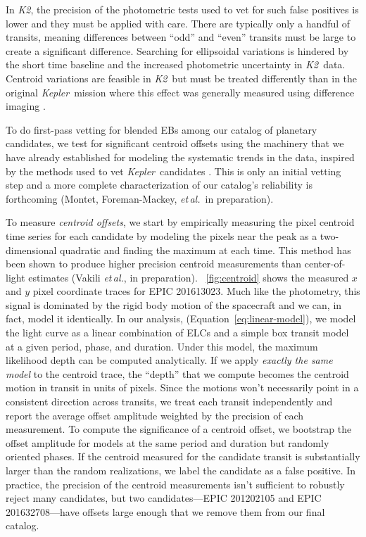 \documentclass[12pt,preprint]{aastex}
\newcommand{\project}[1]{\textsl{#1}} %
\newcommand{\kepler}{\project{Kepler}}
\newcommand{\KT}{\project{K2}}
\newcommand{\foreign}[1]{\emph{#1}}
\newcommand{\etal}{\foreign{et\,al.}}
\newcommand{\figref}[1]{\ref{fig:#1}}
\newcommand{\Fig}[1]{\figurename~\figref{#1}}
\newcommand{\eqalt}[1]{Equation~\ref{eq:#1}}
\begin{document}
In \KT, the precision of the photometric tests used to vet for such
false positives  is lower and they must be applied
with care.  There are typically only a handful of transits, meaning
differences between ``odd'' and ``even'' transits must be large to
create a significant difference. Searching for ellipsoidal variations
is hindered by the short time baseline and the increased photometric
uncertainty in \KT\ data.  Centroid variations are feasible in
\KT\ but must be treated differently than in the original
\kepler\ mission where this effect was generally measured using
difference imaging \citep{Batalha:2010, Bryson:2013}.

To do first-pass vetting for blended EBs among our catalog of
planetary candidates, we test for significant centroid offsets using
the machinery that we have already established for modeling the
systematic trends in the data, inspired by the methods used to vet
\kepler\ candidates \citep{Bryson:2013}.  This is only an initial vetting step
and a more complete characterization of our catalog's reliability is
forthcoming (Montet, Foreman-Mackey, \etal\ in preparation).

To measure \emph{centroid offsets}, we start by empirically measuring the
pixel centroid time series for each candidate by modeling the pixels near the
peak as a two-dimensional quadratic and finding the maximum at each time.
This method has been shown to produce higher precision centroid measurements
than center-of-light estimates (Vakili \etal, in preparation).
\Fig{centroid} shows the measured $x$ and $y$ pixel coordinate traces for EPIC
201613023.
Much like the photometry, this signal is dominated by the rigid body motion
of the spacecraft and we can, in fact, model it identically.
In our analysis, (\eqalt{linear-model}), we model the light curve as a linear
combination of ELCs and a simple box transit model at a given period, phase,
and duration.
Under this model, the maximum likelihood depth can be computed analytically.
If we apply \emph{exactly the same model} to the centroid trace, the ``depth''
that we compute becomes the centroid motion in transit in units of pixels.
Since the motions won't necessarily point in a consistent direction across
transits, we treat each transit independently and report the average offset
amplitude weighted by the precision of each measurement.
To compute the significance of a centroid offset, we bootstrap the offset
amplitude for models at the same period and duration but randomly oriented
phases.
If the centroid measured for the candidate transit is substantially larger
than the random realizations, we label the candidate as a false positive.
In practice, the precision of the centroid measurements isn't sufficient to
robustly reject many candidates, but two candidates---EPIC 201202105 and EPIC
201632708---have offsets large enough that we remove them from our final
catalog.
\end{document}
